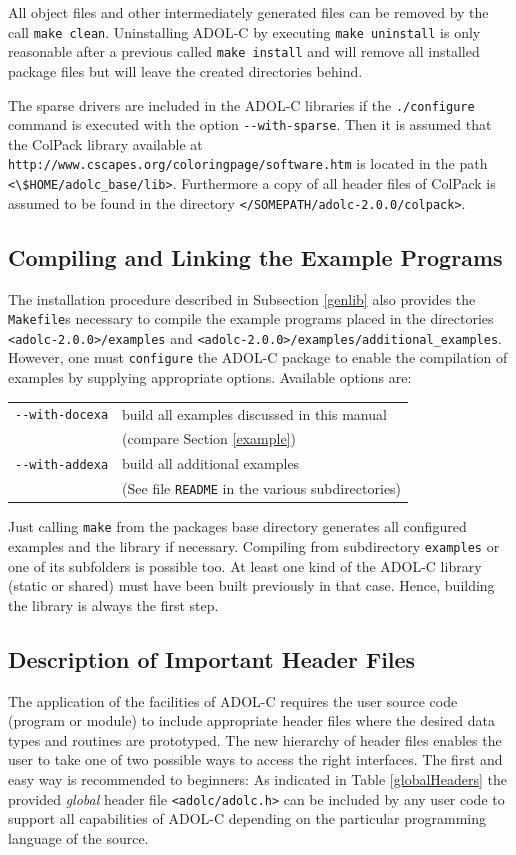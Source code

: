 \documentclass[11pt,twoside]{article}
\begin{document}
All object files and other intermediately generated files can be
removed by the call \verb=make clean=. Uninstalling ADOL-C by
executing \verb=make uninstall= is only reasonable after a previous
called \verb=make install= and will remove all installed package files
but will leave the created directories behind. 

The sparse drivers are included in the ADOL-C libraries if the
\verb=./configure= command is executed with the option
\verb=--with-sparse=. Then it is assumed that the ColPack library
available at
\verb=http://www.cscapes.org/coloringpage/software.htm= is
located in the path \verb=<\$HOME/adolc_base/lib>=. Furthermore a
copy of all header files of ColPack is assumed to be found in
the directory \verb=</SOMEPATH/adolc-2.0.0/colpack>=.
% 
\subsection{Compiling and Linking the Example Programs}
%
The installation procedure described in Subsection \ref{genlib} also
provides the \verb=Makefile=s necessary to compile the example
programs placed in the directories \verb=<adolc-2.0.0>/examples= and
\verb=<adolc-2.0.0>/examples/additional_examples=. However, one must
\verb=configure= the ADOL-C package to enable the compilation of
examples by supplying appropriate options. Available options are: 
\begin{center}
\begin{tabular}[t]{ll}
\verb=--with-docexa=&build all examples discussed in this manual\\
&(compare Section \ref{example})\\
\verb=--with-addexa=&build all additional examples\\
&(See file \verb=README= in the various subdirectories)
\end{tabular}
\end{center}

Just calling \verb=make= from the packages base directory generates
all configured examples and the library if necessary. Compiling from
subdirectory \verb=examples= or one of its subfolders is possible
too. At least one kind of the ADOL-C library (static or shared) must
have been built previously in that case. Hence, building the library
is always the first step. 
%
\subsection{Description of Important Header Files}
\label{ssec:DesIH}
%
The application of the facilities of ADOL-C requires the user 
source code (program or module) to include appropriate 
header files where the desired data types and routines are 
prototyped. The new hierarchy of header files enables the user
to take one of two possible ways to access the right interfaces.
The first and easy way is recommended to beginners: As indicated in
Table \ref{globalHeaders} the provided {\em global} header file 
\verb=<adolc/adolc.h>= can be included by any user code to support all
capabilities of ADOL-C depending on the particular programming language
of the source.    
\end{document}

